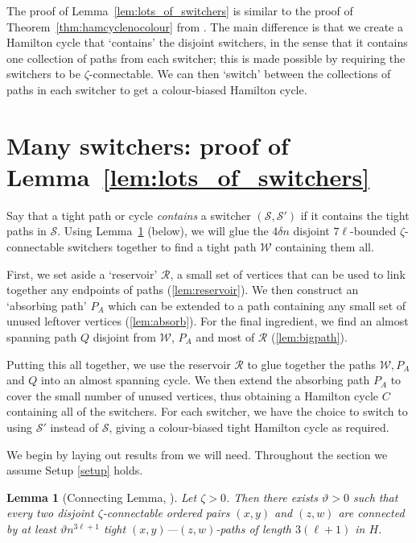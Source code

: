 \documentclass[A4paper,12pt]{article}
\newtheorem{lem}[thm]{Lemma}
\theoremstyle{definition}
\begin{document}
The proof of Lemma~\ref{lem:lots_of_switchers} is similar to the proof of Theorem~\ref{thm:hamcyclenocolour} from \cite{3hamcycle}. The main difference is that we create a Hamilton cycle that `contains' the disjoint switchers, in the sense that it contains one collection of paths from each switcher; this is made possible by requiring the switchers to be $\zeta$-connectable. We can then `switch' between the collections of paths in each switcher to get a colour-biased Hamilton cycle.

\section{Many switchers: proof of Lemma~\ref{lem:lots_of_switchers}}
\label{sec:manys}



Say that a tight path or cycle \emph{contains} a switcher $(\mathcal{S}, \mathcal{S}')$ if it contains the tight paths in $\mathcal{S}$. Using Lemma~\ref{lem:connecting} (below), we will glue the $4\delta n$ disjoint $7\ell$-bounded $\zeta$-connectable switchers together to find a tight path $\mathcal{W}$ containing them all. 

First, we set aside a `reservoir' $\mathcal{R}$, a small set of vertices that can be used to link together any endpoints of paths (\cref{lem:reservoir}). We then construct an `absorbing path' $P_A$ which can be extended to a path containing any small set of unused leftover vertices (\cref{lem:absorb}). 
For the final ingredient, we find an almost spanning path $Q$ disjoint from $\mathcal{W}$, $P_A$ and most of $\mathcal{R}$ (\cref{lem:bigpath}).

Putting this all together, we use the reservoir $\mathcal{R}$ to glue together the paths $\mathcal{W}, P_A$ and $Q$ into an almost spanning cycle. We then extend the absorbing path $P_A$ to cover the small number of unused vertices, thus obtaining a Hamilton cycle $C$ containing all of the switchers. For each switcher, we have the choice to switch to using $\mathcal{S}'$ instead of $\mathcal{S}$, giving a colour-biased tight Hamilton cycle as required. 

We begin by laying out results from \cite{3hamcycle} we will need. Throughout the section we assume Setup \ref{setup} holds.



\begin{lem}[Connecting Lemma, {\cite[Proposition~2.6]{3hamcycle}}]
   \label{lem:connecting} Let $\zeta > 0$. Then there exists $\vartheta > 0$
    such that every two disjoint $\zeta$-connectable ordered pairs $(x, y)$ and $(z, w)$ are connected by
    at least $\vartheta n^{3\ell + 1}$ tight $(x, y)$---$(z, w)$-paths of length $3(\ell+1)$ in $H$.
\end{lem}
\end{document}
